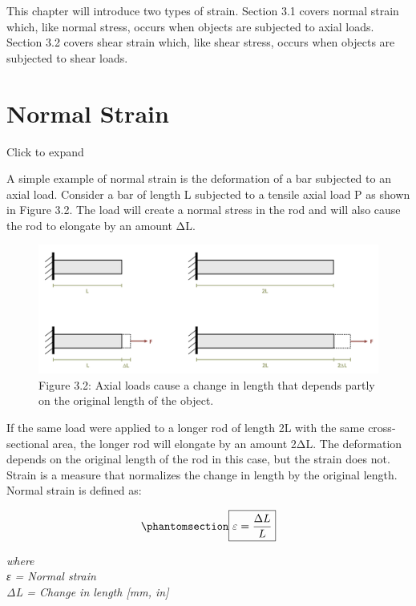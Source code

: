 \documentclass[
  letterpaper,
  DIV=11,
  numbers=noendperiod]{scrreprt}
\theoremstyle{definition}
\theoremstyle{remark}
\begin{document}
This chapter will introduce two types of strain. Section 3.1 covers
normal strain which, like normal stress, occurs when objects are
subjected to axial loads. Section 3.2 covers shear strain which, like
shear stress, occurs when objects are subjected to shear loads.

\section{Normal Strain}\label{sec-3.1}

Click to expand

A simple example of normal strain is the deformation of a bar subjected
to an axial load. Consider a bar of length L subjected to a tensile
axial load P as shown in Figure 3.2. The load will create a normal
stress in the rod and will also cause the rod to elongate by an amount
ΔL.

\begin{figure}[H]

{\centering \includegraphics{images/CH3 PNGs/figure 3.2.png}

}

\caption{Figure 3.2: Axial loads cause a change in length that depends
partly on the original length of the object.}

\end{figure}%

If the same load were applied to a longer rod of length 2L with the same
cross-sectional area, the longer rod will elongate by an amount 2ΔL. The
deformation depends on the original length of the rod in this case, but
the strain does not. Strain is a measure that normalizes the change in
length by the original length. Normal strain is defined as:

\begin{equation}\phantomsection\label{eq-3.1}{
\boxed{\varepsilon=\frac{\Delta L}{L}}
}\end{equation}

\emph{where}\\
\emph{ε = Normal strain}\\
\emph{ΔL = Change in length {[}mm, in{]}}
\end{document}
